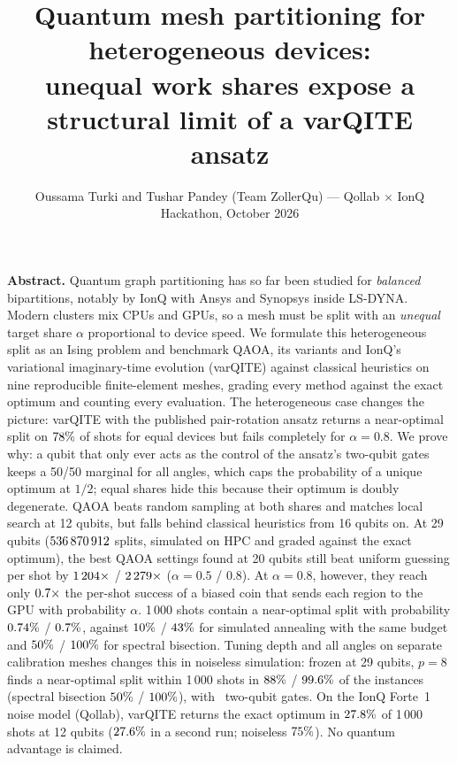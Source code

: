 \documentclass[10pt,twocolumn]{article}
\title{\vspace{-1.0cm}\large\bfseries Quantum mesh partitioning for heterogeneous devices:\\
unequal work shares expose a structural limit of a varQITE ansatz\vspace{-0.2cm}}
\author{\normalsize Oussama Turki and Tushar Pandey (Team ZollerQu) --- Qollab $\times$ IonQ Hackathon, October 2026}
\date{\vspace{-0.7cm}}
\begin{document}
\maketitle

\noindent\textbf{Abstract.} Quantum graph partitioning has so far been studied for \emph{balanced} bipartitions, notably by IonQ with Ansys and Synopsys inside LS-DYNA. Modern clusters mix CPUs and GPUs, so a mesh must be split with an \emph{unequal} target share $\alpha$ proportional to device speed. We formulate this heterogeneous split as an Ising problem and benchmark QAOA, its variants and IonQ's variational imaginary-time evolution (varQITE) against classical heuristics on nine reproducible finite-element meshes, grading every method against the exact optimum and counting every evaluation. The heterogeneous case changes the picture: varQITE with the published pair-rotation ansatz returns a near-optimal split on $78\%$ of shots for equal devices but fails completely for $\alpha{=}0.8$. We prove why: a qubit that only ever acts as the control of the ansatz's two-qubit gates keeps a 50/50 marginal for all angles, which caps the probability of a unique optimum at $1/2$; equal shares hide this because their optimum is doubly degenerate. QAOA beats random sampling at both shares and matches local search at 12 qubits, but falls behind classical heuristics from 16 qubits on. At 29 qubits ($536\,870\,912$ splits, simulated on HPC and graded against the exact optimum), the best QAOA settings found at 20 qubits still beat uniform guessing per shot by $1\,204\times$ / $2\,279\times$ ($\alpha{=}0.5$ / $0.8$). At $\alpha{=}0.8$, however, they reach only $0.7\times$ the per-shot success of a biased coin that sends each region to the GPU with probability $\alpha$. 1\,000 shots contain a near-optimal split with probability $0.74\%$ / $0.7\%$, against $10\%$ / $43\%$ for simulated annealing with the same budget and $50\%$ / $100\%$ for spectral bisection. Tuning depth and all angles on separate calibration meshes changes this in noiseless simulation: frozen at 29 qubits, $p{=}8$ finds a near-optimal split within 1\,000 shots in $88\%$ / $99.6\%$ of the instances (spectral bisection $50\%$ / $100\%$), with \TuneTwentyNineGates\ two-qubit gates. On the IonQ Forte~1 noise model (Qollab), varQITE returns the exact optimum in $27.8\%$ of 1\,000 shots at 12 qubits ($27.6\%$ in a second run; noiseless $75\%$). No quantum advantage is claimed.
\end{document}
